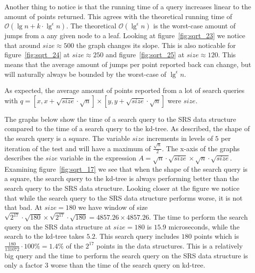 Another thing to notice is that the running time of a query increases linear to the amount of points returned. This agrees with the theoretical running time of $\mathcal{O}(\lg n + k\cdot \lg^\epsilon n)$. The theoretical $\mathcal{O}(\lg^\epsilon n)$ is the worst-case amount of jumps from a any given node to a leaf. Looking at figure~\ref{fig:sqrt_23} we notice that around $size\approx 500$ the graph changes its slope. This is also noticable for figure~\ref{fig:sqrt_24} at $size\approx 250$ and figure~\ref{fig:sqrt_25} at $size \approx 120$. This means that the average amount of jumps per point reported back can change, but will naturally always be bounded by the worst-case of $\lg^\epsilon n$.


As expected, the average amount of points reported from a lot of search queries with $q = [x, x + \sqrt{size}\cdot\sqrt{n}] \times [y, y + \sqrt{size}\cdot\sqrt{n}]$ were $size$.

The graphs below show the time of a search query to the SRS data structure compared to the time of a search query to the kd-tree. As described, the shape of the search query is a square. The variable $size$ increments in levels of $5$ per iteration of the test and will have a maximum of $\frac{\sqrt{n}}{2}$. The x-axis of the graphs describes the $size$ variable in the expression $A = \sqrt{n}\cdot\sqrt{size} \times \sqrt{n}\cdot\sqrt{size}$. Examining figure~\ref{fig:sqrt_17} we see that when the shape of the search query is a square, the search query to the kd-tree is always performing better than the search query to the SRS data structure. Looking closer at the figure we notice that while the search query to the SRS data structure performs worse, it is not that bad. At $size = 180$ we have window of size $\sqrt{2^{17}}\cdot\sqrt{180} \times \sqrt{2^{17}}\cdot\sqrt{180} = 4857.26 \times 4857.26$. The time to perform the search query on the SRS data structure at $size = 180$ is $15.9$ microseconds, while the search to the kd-tree takes $5.2$. This search query includes $180$ points which is $\frac{180}{131072}\cdot 100\% = 1.4\%$ of the $2^{17}$ points in the data structures. This is a relatively big query and the time to perform the search query on the SRS data structure is only a factor $3$ worse than the time of the search query on kd-tree.

